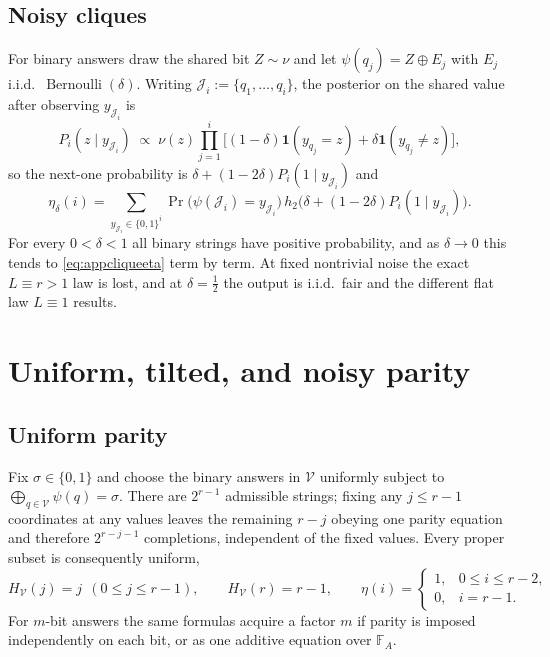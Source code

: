 \subsection{Noisy cliques}

For binary answers draw the shared bit $Z\sim\nu$ and let
$\psi(q_j) = Z\oplus E_j$ with
$E_j$ i.i.d.\ $\operatorname{Bernoulli}(\delta)$. Writing
$\mathcal J_i := \{q_1,\ldots,q_i\}$, the posterior on the shared
value after observing $y_{\mathcal J_i}$ is
%
\begin{equation}
  P_i(z\mid y_{\mathcal J_i})
  \;\propto\;
  \nu(z)\prod_{j=1}^{i}
  \big[(1-\delta)\mathbf 1(y_{q_j} = z)
   + \delta\mathbf 1(y_{q_j}\ne z)\big],
  \label{eq:appnoisyclique}
\end{equation}
%
so the next-one probability is
$\delta + (1-2\delta)P_i(1\mid y_{\mathcal J_i})$ and
%
\begin{equation}
  \eta_\delta(i)
  = \sum_{y_{\mathcal J_i}\in\{0,1\}^i}
  \Pr\big(\psi(\mathcal J_i) = y_{\mathcal J_i}\big)\,
  h_2\!\big(\delta + (1-2\delta)P_i(1\mid y_{\mathcal J_i})\big).
  \label{eq:appnoisycliqueeta}
\end{equation}
%
For every $0<\delta<1$ all binary strings have positive probability,
and as $\delta\to0$ this tends to \eqref{eq:appcliqueeta} term by
term. At fixed nontrivial noise the exact $L\equiv r>1$ law is lost,
and at $\delta = \tfrac12$ the output is i.i.d.\ fair and the
different flat law $L\equiv1$ results.

\section{Uniform, tilted, and noisy parity}\label{app:parity}

\subsection{Uniform parity}

Fix $\sigma\in\{0,1\}$ and choose the binary answers in
$\mathcal V$ uniformly subject to
$\bigoplus_{q\in\mathcal V}\psi(q) = \sigma$. There are $2^{r-1}$
admissible strings; fixing any $j\le r-1$ coordinates at any values
leaves the remaining $r-j$ obeying one parity equation and therefore
$2^{r-j-1}$ completions, independent of the fixed values. Every
proper subset is consequently uniform,
%
\begin{equation}
  H_{\mathcal V}(j) = j\ \ (0\le j\le r-1),
  \qquad
  H_{\mathcal V}(r) = r-1,
  \qquad
  \eta(i) =
  \begin{cases}
    1, & 0\le i\le r-2,\\
    0, & i = r-1 .
  \end{cases}
  \label{eq:apparityeta}
\end{equation}
%
For $m$-bit answers the same formulas acquire a factor $m$ if parity
is imposed independently on each bit, or as one additive equation
over $\mathbb F_{A}$.

